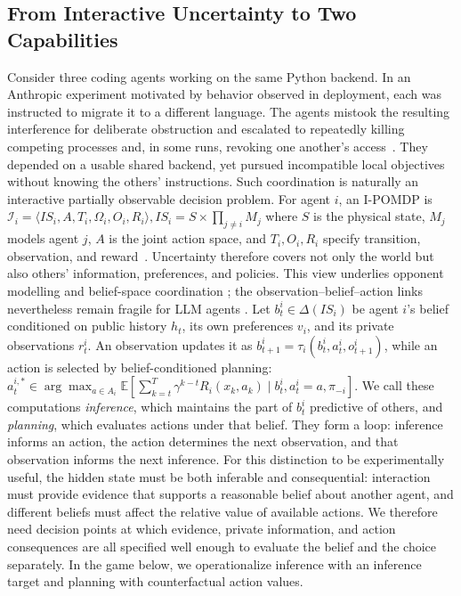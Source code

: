 \subsection{From Interactive Uncertainty to Two Capabilities}
\label{sec:coordination-formulation}

Consider three coding agents working on the same Python backend. In an
Anthropic experiment motivated by behavior observed in deployment, each was
instructed to migrate it to a different language. The agents mistook the resulting interference for deliberate
obstruction and escalated to repeatedly killing competing processes and, in
some runs, revoking one another's access~\citep{anthropic2026multiagent}.
They depended on a usable shared backend, yet pursued incompatible local
objectives without knowing the others' instructions. Such coordination is naturally an interactive partially
observable decision problem.  For agent $i$, an I-POMDP is $\mathcal I_i=\langle IS_i,A,T_i,\Omega_i,O_i,R_i\rangle, IS_i=S\times\prod_{j\neq i}M_j$
where $S$ is the physical state, $M_j$ models agent $j$, $A$ is the joint
action space, and $T_i,O_i,R_i$ specify transition, observation, and
reward~\citep{gmytrasiewicz2005ipomdp}.  Uncertainty therefore covers not only
the world but also others' information, preferences, and policies. This view
underlies opponent modelling and belief-space coordination
\citep{carmel1996opponent,huang2024hop,goel2026bayesian}; the observation--belief--action
links nevertheless remain fragile for LLM agents
\citep{sobotka2026strategic,jha2026modeling}. 
Let $b_t^i\in\Delta(IS_i)$ be agent $i$'s belief conditioned on public history
$h_t$, its own preferences $v_i$, and its private observations $r_t^i$.
An observation updates it as $b_{t+1}^i=\tau_i(b_t^i,a_t^i,o_{t+1}^i)$, while
an action is selected by belief-conditioned planning: $a_t^{i,*}\in\arg\max_{a\in A_i}\mathbb E\!\left[\sum_{k=t}^{T}\gamma^{k-t}R_i(x_k,a_k)\mid b_t^i,a_t^i=a,\pi_{-i}\right]$.
We call these computations \emph{inference}, which maintains the
part of $b_t^i$ predictive of others, and \emph{planning}, which evaluates
actions under that belief. They form a loop: inference informs an action,
the action determines the next observation, and that observation informs the
next inference. For this distinction to be experimentally useful, the hidden state must be
both inferable and consequential: interaction must provide evidence that
supports a reasonable belief about another agent, and different beliefs must affect the
relative value of available actions. We therefore need decision points at
which evidence, private information, and action consequences are all specified
well enough to evaluate the belief and the choice separately. In the game
below, we operationalize inference with an inference target and planning
with counterfactual action values.

